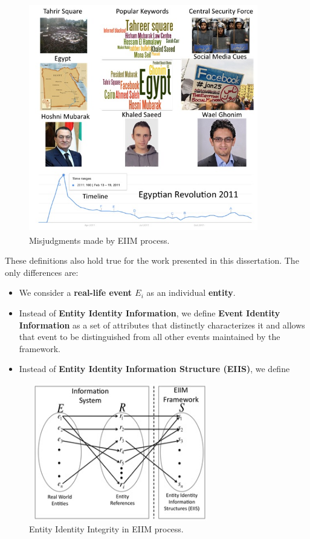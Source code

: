 \begin{figure}[htbp]
  \caption{Misjudgments made by EIIM process.}
\label{identityIntegrity2}
  \centering
    \includegraphics[width=10cm,height=10cm]{Figures/eventIdentity.jpg}
\end{figure}

These definitions also hold true for the work presented in this dissertation. The only differences are:
\begin{itemize}
\item We consider a \textbf{real-life event $E_{i}$} as an individual \textbf{entity}.

\item Instead of \textbf{Entity Identity Information}, we define \textbf{Event Identity Information} as a set of attributes that distinctly characterizes it and allows that event to be distinguished from all other events maintained by the framework.

\item Instead of \textbf{Entity Identity Information Structure (EIIS)}, we define 
\end{itemize}



\begin{figure}[htbp]
  \caption{Entity Identity Integrity in EIIM process.}
\label{identityIntegrity1}
  \centering
    \includegraphics[width=8cm,height=6cm]{Figures/identityIntegrityMDM1.jpg}
\end{figure}



